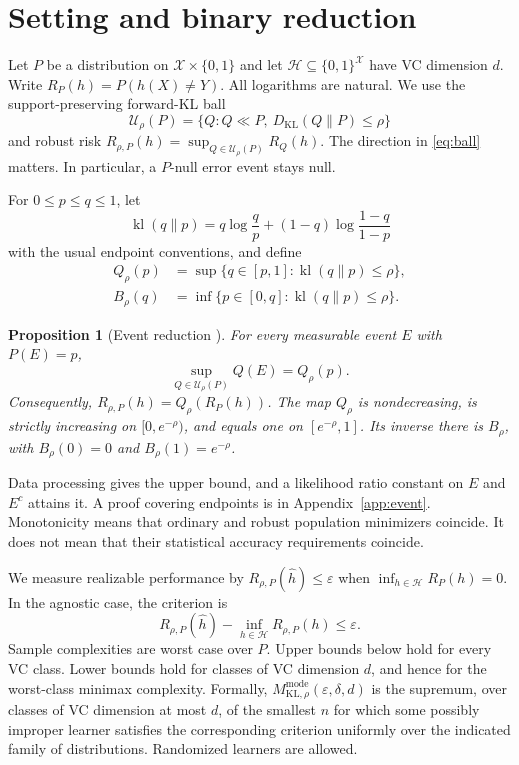 \documentclass{article}
\newtheorem{proposition}[theorem]{Proposition}
\theoremstyle{remark}
\newcommand{\cH}{\mathcal H}
\newcommand{\cU}{\mathcal U}
\newcommand{\KL}{D_{\mathrm{KL}}}
\newcommand{\kl}{\operatorname{kl}}
\newcommand{\eps}{\varepsilon}
\begin{document}
\section{Setting and binary reduction}
\label{sec:setting}

Let $P$ be a distribution on $\mathcal X\times\{0,1\}$ and let
$\cH\subseteq\{0,1\}^{\mathcal X}$ have VC dimension $d$.  Write
$R_P(h)=P(h(X)\ne Y)$.  All logarithms are natural.  We use the
support-preserving forward-KL ball
\begin{equation}
 \cU_\rho(P)=\{Q:Q\ll P,\ \KL(Q\|P)\le\rho\}
 \label{eq:ball}
\end{equation}
and robust risk
$R_{\rho,P}(h)=\sup_{Q\in\cU_\rho(P)}R_Q(h)$.  The direction in
\eqref{eq:ball} matters.  In particular, a $P$-null error event stays null.

For $0\le p\le q\le1$, let
\[
 \kl(q\|p)=q\log\frac qp+(1-q)\log\frac{1-q}{1-p}
\]
with the usual endpoint conventions, and define
\begin{align}
 Q_\rho(p)&=\sup\{q\in[p,1]:\kl(q\|p)\le\rho\},
 \label{eq:Qdef}\\
 B_\rho(q)&=\inf\{p\in[0,q]:\kl(q\|p)\le\rho\}.
 \label{eq:Bdef}
\end{align}

\begin{proposition}[Event reduction \citealp{huhongso2013ambiguous}]
\label{prop:event}
For every measurable event $E$ with $P(E)=p$,
\[
 \sup_{Q\in\cU_\rho(P)}Q(E)=Q_\rho(p).
\]
Consequently, $R_{\rho,P}(h)=Q_\rho(R_P(h))$.  The map $Q_\rho$ is
nondecreasing, is strictly increasing on $[0,e^{-\rho})$, and equals one on
$[e^{-\rho},1]$.  Its inverse there is $B_\rho$, with
$B_\rho(0)=0$ and $B_\rho(1)=e^{-\rho}$.
\end{proposition}

Data processing gives the upper bound, and a likelihood ratio constant on
$E$ and $E^c$ attains it.  A proof covering endpoints is in
Appendix~\ref{app:event}.  Monotonicity means that ordinary and robust
population minimizers coincide.  It does not mean that their statistical
accuracy requirements coincide.

We measure realizable performance by $R_{\rho,P}(\widehat h)\le\eps$ when
$\inf_{h\in\cH}R_P(h)=0$.  In the agnostic case, the criterion is
\begin{equation}
 R_{\rho,P}(\widehat h)-\inf_{h\in\cH}R_{\rho,P}(h)\le\eps.
 \label{eq:agnostic-criterion}
\end{equation}
Sample complexities are worst case over $P$.  Upper bounds below hold for
every VC class.  Lower bounds hold for classes of VC dimension $d$, and hence
for the worst-class minimax complexity.
Formally, $M^{\mathrm{mode}}_{\mathrm{KL},\rho}(\eps,\delta,d)$ is the
supremum, over classes of VC dimension at most $d$, of the smallest $n$ for
which some possibly improper learner satisfies the corresponding criterion
uniformly over the indicated family of distributions.  Randomized learners
are allowed.
\end{document}
